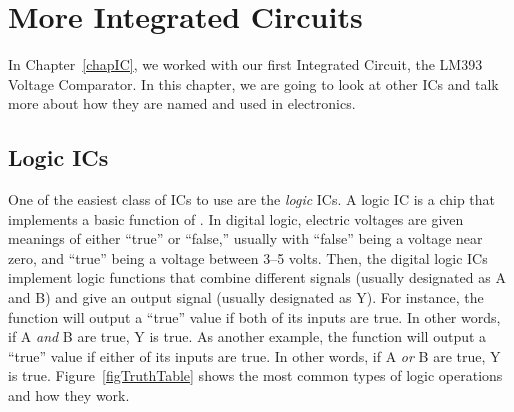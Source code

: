 \chapter{More Integrated Circuits}
\label{chapLogicICs}

In Chapter~\ref{chapIC}, we worked with our first Integrated Circuit, the LM393 Voltage Comparator.  
In this chapter, we are going to look at other ICs and talk more about how they are named and used in electronics.

\section{Logic ICs}

One of the easiest class of ICs to use are the \emph{logic} ICs.  
A logic IC is a chip that implements a basic function of .
In digital logic, electric voltages are given meanings of either ``true'' or ``false,'' usually with ``false'' being a voltage near zero, and ``true'' being a voltage between 3--5 volts.
Then, the digital logic ICs implement logic functions that combine different signals (usually designated as A and B) and give an output signal (usually designated as Y).
For instance, the  function will output a ``true'' value if both of its inputs are true.  
In other words, if A \emph{and} B are true, Y is true.
As another example, the  function will output a ``true'' value if either of its inputs are true.
In other words, if A \emph{or} B are true, Y is true.
Figure~\ref{figTruthTable} shows the most common types of logic operations and how they work.

